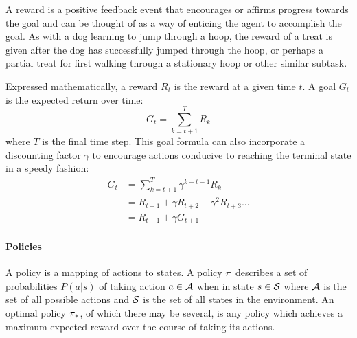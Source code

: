 A reward is a positive feedback event that encourages or affirms progress
towards the goal
and 
can be thought of as a way of enticing the agent to accomplish the goal.
%
As with a dog learning to jump through a hoop,
the reward of a treat is given after the dog has successfully jumped
through the hoop,
or perhaps a partial treat for first walking through a stationary hoop
or other similar subtask.

Expressed mathematically, a reward $R_t$ is the reward at a given time $t$.
%
A goal $G_t$ is the expected return over time:
\[
	G_t = \sum_{k=t+1}^{T} R_k
\]
where $T$ is the final time step.
%
This goal formula can also incorporate a discounting factor $\gamma$ to
encourage actions conducive to reaching the terminal state in a speedy fashion:
\begin{align*}
	G_t &= \sum_{k=t+1}^{T} \gamma^{k-t-1} R_k \\
		&= R_{t+1} + \gamma R_{t+2} + \gamma^2 R_{t+3} ... \\
		&= R_{t+1} + \gamma G_{t+1}
\end{align*}

\paragraph*{Policies}

A policy is a mapping of actions to states.
%
A policy $\pi$ describes a set of probabilities $P(a|s)$
of taking action $a \in \mathcal{A}$
when in state $s \in \mathcal{S}$
where $\mathcal{A}$ is the set of all possible actions
and $\mathcal{S}$ is the set of all states in the environment.
%
An optimal policy $\pi_*$,
of which there may be several,
is any policy which achieves a maximum expected reward over the course of
taking its actions.

